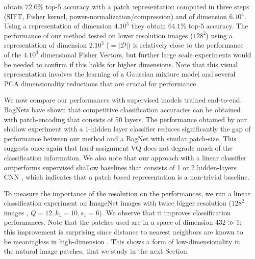 \documentclass{article} %
\begin{document}
\cite{sanchez2013image} obtain $72.0\%$ top-5 accuracy with a patch representation computed in three steps (SIFT, Fisher kernel, power-normalization/compression) and of dimension $6.10^4$.
Using a representation of dimension $4.10^3$ they obtain $64.1\%$ top-5 accuracy.
The performance of our method tested on lower resolution images ($128^2$) using a representation of dimension $2.10^3$ ($=|\mathcal{D}|$) is relatively close to the performance of the $4.10^3$ dimensional Fisher Vectors, but further large scale experiments would be needed to confirm if this holds for higher dimensions.
Note that this visual representation involves the learning of a Gaussian mixture model and several PCA dimensionality reductions that are crucial for performance.

We now compare our performances with supervised models trained end-to-end.
BagNets \citep{brendel2019approximating} have shown that  competitive classification accuracies can be obtained with patch-encoding that consists of 50 layers.
The performance obtained by our shallow experiment with a 1-hidden layer classifier reduces significantly the gap of performance between our method and a BagNet with similar patch-size.
This suggests once again that hard-assignment VQ does not degrade much of the classification information.
We also note that our approach with a linear classifier outperforms supervised shallow baselines that consists of 1 or 2 hidden-layers CNN \citep{belilovsky2018greedy}, which indicates that a patch based representation is a non-trivial baseline.

To measure the importance of the resolution on the performances, we run a linear classification experiment on ImageNet images with twice bigger resolution ($128^2$ images , $Q=12, k_1=10,s_1=6$).
We observe that it improves classification performances.
Note that the patches used are in a space of dimension $432 \gg 1$: this improvement is surprising since distance to nearest neighbors are known to be meaningless in high-dimension \citep{beyer1999nearest}.
This shows a form of low-dimensionality in the natural image patches, that we study in the next Section.
\end{document}
